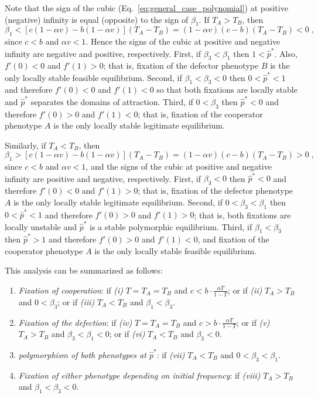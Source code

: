 \documentclass[12pt]{extarticle}
\begin{document}
{\begin{appendices}
Note that the sign of the  cubic (Eq.\ \ref{eq:general_case_polynomial}) at positive (negative) infinity is equal (opposite) to the sign of $\beta_1$. 
If $T_A>T_B$, then 
\begin{equation} \label{eq:beta1}
   \beta_1 < [c(1-\alpha v) - b(1-\alpha v)] (T_A-T_B) 
   = (1-\alpha v)(c-b)(T_A-T_B) < 0 \;,
 \end{equation}
since $c<b$ and $\alpha v < 1$. Hence the signs of the cubic at positive and negative infinity are negative and positive, respectively.
First, if $\beta_3<\beta_1$ then 
$1<\hat{p}^*$. Also, $f'(0)<0$ and $f'(1)>0$; that is, fixation of the defector phenotype $B$ is the only locally stable feasible equilibrium.
Second, if $\beta_1<\beta_3<0$ then 
$0<\hat{p}^*<1$ and therefore $f'(0)<0$ and $f'(1)<0$ so that both fixations are locally stable and $\hat{p}^*$ separates the domains of attraction.
Third, if $0<\beta_3$ then 
$\hat{p}^*<0$ and therefore $f'(0)>0$ and $f'(1)<0$; that is, fixation of the cooperator phenotype $A$ is the only locally stable legitimate equilibrium.

Similarly, if $T_A<T_B$, then
\begin{equation} \label{eq:beta1_rev}
   \beta_1 > [c(1-\alpha v) - b(1-\alpha v)] (T_A-T_B) 
   = (1-\alpha v)(c-b)(T_A-T_B) > 0 \;,
 \end{equation}
since $c<b$ and $\alpha v < 1$, and the signs of the cubic at positive and negative infinity are positive and negative, respectively. 
First, if $\beta_3<0$ then $\hat{p}^*<0$ and therefore $f'(0)<0$ and $f'(1)>0$; that is, fixation of the defector phenotype $A$ is the only locally stable legitimate equilibrium.
Second, if $0<\beta_3<\beta_1$ then $0<\hat{p}^*<1$ and therefore $f'(0)>0$ and $f'(1)>0$; that is, both fixations are locally unstable and $\hat{p}^*$ is a stable polymorphic equilibrium.
Third, if $\beta_1<\beta_3$ then $\hat{p}^*>1$ and therefore $f'(0)>0$ and $f'(1)<0$, and fixation of the cooperator phenotype $A$ is the only locally stable feasible equilibrium.

This analysis can be summarized as follows:
\begin{enumerate}
\item \emph{Fixation of cooperation}: 
	if \emph{(i)} $T=T_A=T_B$ and $c < b\cdot \frac{\alpha T}{1-T}$; or
	if \emph{(ii)} $T_A>T_B$ and $0<\beta_3$; or 
	if \emph{(iii)} $T_A<T_B$ and $\beta_1<\beta_3$.
\item \emph{Fixation of the defection}: 
	if \emph{(iv)}  $T=T_A=T_B$ and $c > b\cdot \frac{\alpha T}{1-T}$; or 
	if \emph{(v)} $T_A>T_B$ and $\beta_3<\beta_1<0$; or 
	if \emph{(vi)} $T_A<T_B$ and $\beta_3<0$.
\item \emph{polymorphism of both phenotypes at $\hat{p}^*$}: 
	if \emph{(vii)} $T_A < T_B$ and $0<\beta_3<\beta_1$.
\item \emph{Fixation of either phenotype depending on initial frequency}:
	if \emph{(viii)}  $T_A>T_B$ and $\beta_1<\beta_3<0$.
\end{enumerate}


\end{appendices}}
\end{document}
